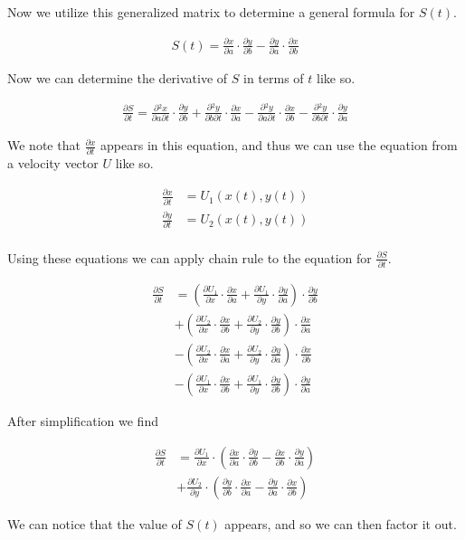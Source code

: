 \documentclass[10pt]{article}
\newcommand{\der}[2]{\frac{\partial{} #1}{\partial{} #2}}
\newcommand{\sder}[3]{\frac{\partial{}^{2} #1}{\partial{} #2 \partial{} #3}}
\begin{document}
\begin{multicols}{2}
  Now we utilize this generalized matrix to determine a general formula for
  $S(t)$.

  \begin{align*}
    S(t) = \der{x}{a}\cdot\der{y}{b}-\der{y}{a}\cdot\der{x}{b}
  \end{align*}

  Now we can determine the derivative of $S$ in terms of $t$ like so.

  \begin{align*}
    \der{S}{t} = \sder{x}{a}{t} \cdot \der{y}{b} + \sder{y}{b}{t} \cdot
    \der{x}{a} - \sder{y}{a}{t} \cdot \der{x}{b} - \sder{y}{b}{t} \cdot \der{y}{a}
  \end{align*}

  We note that $\der{x}{t}$ appears in this equation, and thus we can use the
  equation from a velocity vector $U$ like so.

  \begin{align*}
    \der{x}{t} &= U_1\left(x\left(t\right), y\left(t\right)\right)\\
    \der{y}{t} &= U_2\left(x\left(t\right), y\left(t\right)\right)\\
  \end{align*}

  Using these equations we can apply chain rule to the equation for
  $\der{S}{t}$.

  \begin{align*}
    \der{S}{t} &=
    \left(\der{U_1}{x}\cdot\der{x}{a} + \der{U_1}{y}\cdot\der{y}{a}\right)\cdot\der{y}{b}\\
    &+\left(\der{U_2}{x}\cdot\der{x}{b} + \der{U_2}{y}\cdot\der{y}{b}\right)\cdot\der{x}{a}\\
    &-\left(\der{U_2}{x}\cdot\der{x}{a} + \der{U_2}{y}\cdot\der{y}{a}\right)\cdot\der{x}{b}\\
    &-\left(\der{U_1}{x}\cdot\der{x}{b} + \der{U_1}{y}\cdot\der{y}{b}\right)\cdot\der{y}{a}
  \end{align*}

  After simplification we find

  \begin{align*}
    \der{S}{t} &=
    \der{U_1}{x}\cdot\left(\der{x}{a}\cdot\der{y}{b}-\der{x}{b}\cdot\der{y}{a}\right)\\
    &+ \der{U_2}{y}\cdot\left(\der{y}{b}\cdot\der{x}{a}-\der{y}{a}\cdot\der{x}{b}\right)
  \end{align*}

  We can notice that the value of $S(t)$ appears, and so we can then factor it
  out.


\end{multicols}
\end{document}
